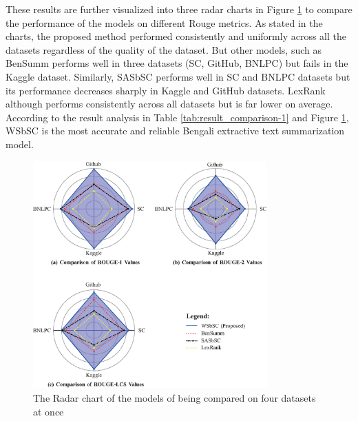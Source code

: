 \documentclass[acmlarge]{acmart}
\begin{document}
These results are further visualized into three radar charts in Figure \ref{fig:radarchart} to compare the performance of the models on different Rouge metrics. As stated in the charts, the proposed method performed consistently and uniformly across all the datasets regardless of the quality of the dataset. But other models, such as BenSumm performs well in three datasets (SC, GitHub, BNLPC) but fails in the Kaggle dataset. Similarly, SASbSC performs well in SC and BNLPC datasets but its performance decreases sharply in Kaggle and GitHub datasets. LexRank although performs consistently across all datasets but is far lower on average. According to the result analysis in Table \ref{tab:result_comparison-1} and Figure \ref{fig:radarchart}, WSbSC is the most accurate and reliable Bengali extractive text summarization model.
\begin{figure}[]
	\centering
	\includegraphics[width=0.8\textwidth]{figs/radar-chart-edited}
	\caption{The Radar chart of the models of being compared on four datasets at once}
	\label{fig:radarchart}
\end{figure}
\end{document}
